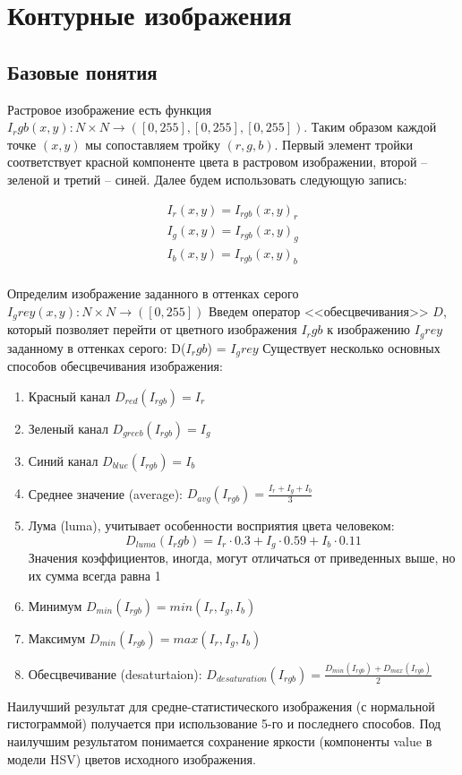 \chapter{Контурные изображения}
\section{Базовые понятия}
Растровое изображение есть функция $I_rgb(x,y): N \times N \to([0,255],[0,255],[0,255])$. Таким образом каждой точке $(x,y)$ мы сопоставляем тройку $(r,g,b)$. Первый элемент тройки соответствует красной компоненте цвета в растровом изображении, второй -- зеленой и третий -- синей. Далее будем использовать следующую запись:

$$
\begin{array}{l}
I_r(x,y) = I_{rgb}(x,y)_r \\
I_g(x,y) = I_{rgb}(x,y)_g \\
I_b(x,y) = I_{rgb}(x,y)_b \\
\end{array}
$$

Определим изображение заданного в оттенках серого
$I_grey(x,y): N \times N \to([0,255])$
Введем оператор <<обесцвечивания>> $D$, который позволяет перейти от цветного изображения $I_rgb$ к изображению $I_grey$ заданному в оттенках серого:
D($I_rgb$) = $I_grey$
Существует несколько основных способов обесцвечивания изображения:
\begin{enumerate}
 \item Красный канал $D_{red}(I_{rgb}) = I_r$
 \item Зеленый канал $D_{greeb}(I_{rgb}) = I_g$
 \item Синий канал $D_{blue}(I_{rgb}) = I_b$  
 \item Среднее значение (average): $D_{avg}(I_{rgb}) = \frac{I_r + I_g + I_b}{3}$
 \item Лума (luma), учитывает особенности восприятия цвета человеком: $$D_{luma}(I_rgb) = I_r\cdot0.3 + I_g\cdot0.59 + I_b\cdot0.11$$
 		Значения коэффициентов, иногда, могут отличаться от приведенных выше, но их сумма всегда равна 1
 \item Минимум  $D_{min}(I_{rgb}) = min(I_r, I_g, I_b)$
 \item Максимум  $D_{min}(I_{rgb}) = max(I_r, I_g, I_b)$
 \item Обесцвечивание (desaturtaion): $D_{desaturation}(I_{rgb}) = \frac{D_{min}(I_{rgb}) + D_{max}(I_{rgb})}{2}$
\end{enumerate}

Наилучший результат для средне-статистического изображения (с нормальной гистограммой) получается при использование 5-го и последнего способов. Под наилучшим результатом понимается сохранение яркости (компоненты value в модели HSV) цветов исходного изображения.

